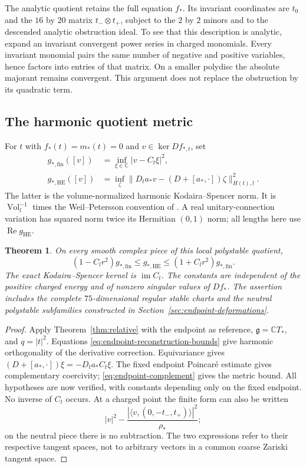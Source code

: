 \documentclass[11pt]{amsart}
\newtheorem{theorem}{Theorem}[section]
\theoremstyle{definition}
\theoremstyle{remark}
\newcommand{\CC}{\mathbb C}
\newcommand{\Vol}{\operatorname{Vol}}
\newcommand{\im}{\operatorname{im}}
\begin{document}
The analytic quotient retains the full equation $f_*$. Its invariant
coordinates are $t_0$ and the $16$ by $20$ matrix
$t_-\otimes t_+$, subject to the $2$ by $2$ minors and to the descended
analytic obstruction ideal. To see that this description is analytic,
expand an invariant convergent power series in charged monomials.
Every invariant monomial pairs the same number of negative and positive
variables, hence factors into entries of that matrix. On a smaller
polydisc the absolute majorant remains convergent. This argument does
not replace the obstruction by its quadratic term.

\subsection{The harmonic quotient metric}
For $t$ with $f_*(t)=m_*(t)=0$ and $v\in\ker Df_{*,t}$, set
\begin{align}
 g_{*,\mathrm{fin}}([v])
 &=\inf_{\xi\in\CC}|v-C_t\xi|^2,\label{eq:endpoint-finite}\\
 g_{*,\mathrm{HE}}([v])
 &=\inf_\zeta\|D_ta_*v-(D+[a_*,\cdot])\zeta\|_{H(t),l}^2.
 \label{eq:endpoint-he}
\end{align}
The latter is the volume-normalized harmonic Kodaira--Spencer norm.
It is $\Vol_l^{-1}$ times the Weil--Petersson convention of
\cite[Section~4.1]{BiswasSchumacher16}. A real unitary-connection
variation has squared norm twice its Hermitian $(0,1)$ norm; all
lengths here use $\operatorname{Re}g_{\mathrm{HE}}$.

\begin{theorem}\label{thm:endpoint-metric}
On every smooth complex piece of this local polystable quotient,
\begin{equation}\label{eq:endpoint-relative}
 (1-C_lr^2)g_{*,\mathrm{fin}}\le g_{*,\mathrm{HE}}
 \le(1+C_lr^2)g_{*,\mathrm{fin}}.
\end{equation}
The exact Kodaira--Spencer kernel is $\im C_t$. The constants are
independent of the positive charged energy and of nonzero singular
values of $Df_*$. The assertion includes the complete $75$-dimensional
regular stable charts and the neutral polystable subfamilies constructed
in Section~\ref{sec:endpoint-deformations}.
\end{theorem}
\begin{proof}
Apply Theorem~\ref{thm:relative} with the endpoint as reference,
$\mathfrak g=\CC T_*$, and $q=|t|^2$. Equations
\eqref{eq:endpoint-reconstruction-bounds} give harmonic orthogonality
of the derivative correction. Equivariance gives
$(D+[a_*,\cdot])\xi=-D_ta_*C_t\xi$. The fixed endpoint Poincar\'e
estimate gives complementary coercivity; \eqref{eq:endpoint-complement}
gives the metric bound. All hypotheses are now verified, with constants
depending only on the fixed endpoint. No inverse of $C_t$ occurs.
At a charged point the finite form can also be written
\[
 |v|^2-\frac{|\langle v,(0,-t_-,t_+)\rangle|^2}{\rho_*};
\]
on the neutral piece there is no subtraction. The two expressions
refer to their respective tangent spaces, not to arbitrary vectors
in a common coarse Zariski tangent space.
\end{proof}
\end{document}
